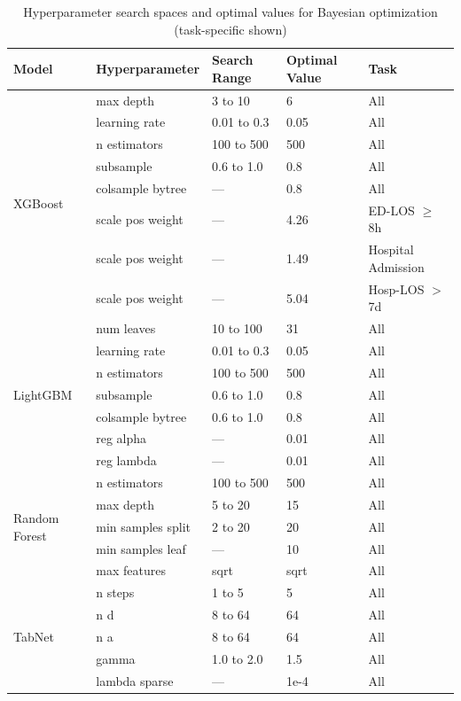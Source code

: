 \documentclass[harvard,article]{frontiersinFPHY_FAMS}
\begin{document}
\begin{table}[t]
\centering
\caption{Hyperparameter search spaces and optimal values for Bayesian optimization (task-specific shown)}
\label{tab:hyperparameters}
\begin{tabular}{l l l l l}
\toprule
\textbf{Model} & \textbf{Hyperparameter} & \textbf{Search Range} & \textbf{Optimal Value} & \textbf{Task} \\
\midrule
\multirow{8}{*}{XGBoost} & max depth & 3 to 10 & 6 & All \\
 & learning rate & 0.01 to 0.3 & 0.05 & All \\
 & n estimators & 100 to 500 & 500 & All \\
 & subsample & 0.6 to 1.0 & 0.8 & All \\
 & colsample bytree & --- & 0.8 & All \\
 & scale pos weight & --- & 4.26 & ED-LOS $\geq$8h \\
 & scale pos weight & --- & 1.49 & Hospital Admission \\
 & scale pos weight & --- & 5.04 & Hosp-LOS $>$7d \\
\midrule
\multirow{7}{*}{LightGBM} & num leaves & 10 to 100 & 31 & All \\
 & learning rate & 0.01 to 0.3 & 0.05 & All \\
 & n estimators & 100 to 500 & 500 & All \\
 & subsample & 0.6 to 1.0 & 0.8 & All \\
 & colsample bytree & 0.6 to 1.0 & 0.8 & All \\
 & reg alpha & --- & 0.01 & All \\
 & reg lambda & --- & 0.01 & All \\
\midrule
\multirow{5}{*}{Random Forest} & n estimators & 100 to 500 & 500 & All \\
 & max depth & 5 to 20 & 15 & All \\
 & min samples split & 2 to 20 & 20 & All \\
 & min samples leaf & --- & 10 & All \\
 & max features & sqrt & sqrt & All \\
\midrule
\multirow{5}{*}{TabNet} & n steps & 1 to 5 & 5 & All \\
 & n d & 8 to 64 & 64 & All \\
 & n a & 8 to 64 & 64 & All \\
 & gamma & 1.0 to 2.0 & 1.5 & All \\
 & lambda sparse & --- & 1e-4 & All \\
\bottomrule
\end{tabular}
\end{table}
\end{document}
